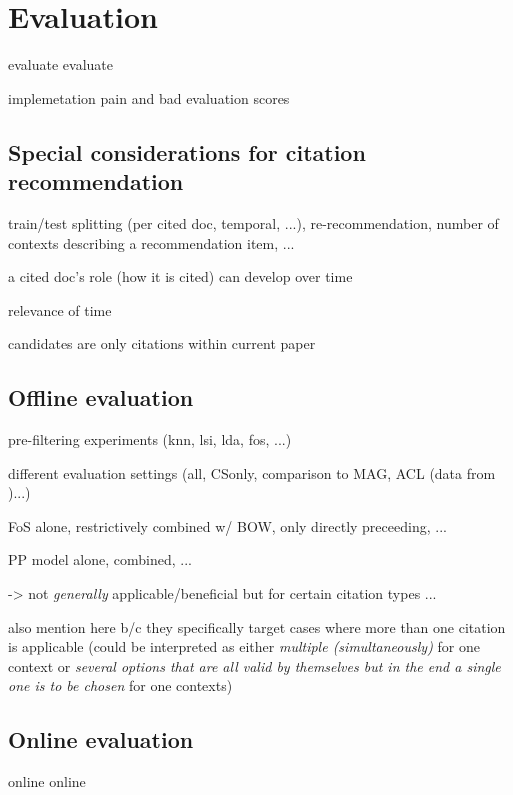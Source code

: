 \chapter{Evaluation}\label{chap:evaluation}
evaluate evaluate

implemetation pain and bad evaluation scores\cite{Beel2017}

\section{Special considerations for citation recommendation}
train/test splitting (per cited doc, temporal, ...), re-recommendation, number of contexts describing a recommendation item, ...

a cited doc's role (how it is cited) can develop over time\cite{Swales1986,He2018}

relevance of time\cite{Beel2017a}

candidates are only citations within current paper\cite{Duma2014}

\section{Offline evaluation}
pre-filtering experiments (knn\cite{Bhagavatula2018}, lsi, lda, fos, ...)

different evaluation settings (all, CSonly, comparison to MAG, ACL (data from \cite{Faerber2018b})...)

FoS alone, restrictively combined w/ BOW, only directly preceeding, ...

PP model alone, combined, ...

-> not \emph{generally} applicable/beneficial but for certain citation types ...

also mention \cite{Kobayashi2018} here b/c they specifically target cases where more than one citation is applicable (could be interpreted as either \emph{multiple (simultaneously)} for one context or \emph{several options that are all valid by themselves but in the end a single one is to be chosen} for one contexts)

\section{Online evaluation}
online online
